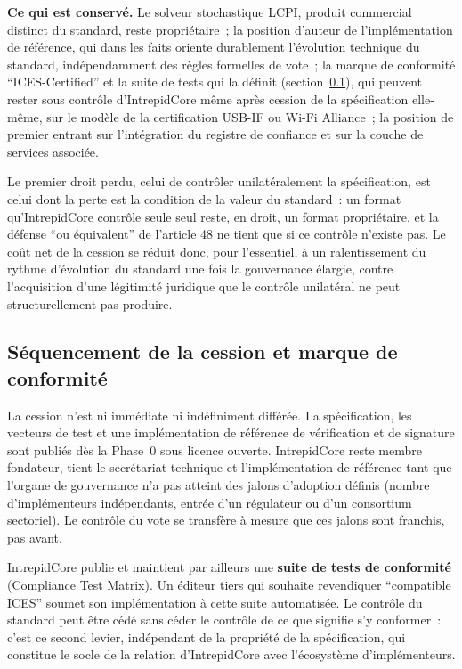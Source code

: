 \documentclass[11pt,a4paper]{article}
\begin{document}
\textbf{Ce qui est conservé.} Le solveur stochastique LCPI, produit commercial distinct du standard, reste propriétaire~; la position d'auteur de l'implémentation de référence, qui dans les faits oriente durablement l'évolution technique du standard, indépendamment des règles formelles de vote~; la marque de conformité \enquote{ICES-Certified} et la suite de tests qui la définit (section~\ref{sec:conformite}), qui peuvent rester sous contrôle d'IntrepidCore même après cession de la spécification elle-même, sur le modèle de la certification USB-IF ou Wi-Fi Alliance~; la position de premier entrant sur l'intégration du registre de confiance et sur la couche de services associée.

Le premier droit perdu, celui de contrôler unilatéralement la spécification, est celui dont la perte est la condition de la valeur du standard~: un format qu'IntrepidCore contrôle seule seul reste, en droit, un format propriétaire, et la défense \enquote{ou équivalent} de l'article 48 ne tient que si ce contrôle n'existe pas. Le coût net de la cession se réduit donc, pour l'essentiel, à un ralentissement du rythme d'évolution du standard une fois la gouvernance élargie, contre l'acquisition d'une légitimité juridique que le contrôle unilatéral ne peut structurellement pas produire.

\subsection{Séquencement de la cession et marque de conformité}\label{sec:conformite}

La cession n'est ni immédiate ni indéfiniment différée. La spécification, les vecteurs de test et une implémentation de référence de vérification et de signature sont publiés dès la Phase~0 sous licence ouverte. IntrepidCore reste membre fondateur, tient le secrétariat technique et l'implémentation de référence tant que l'organe de gouvernance n'a pas atteint des jalons d'adoption définis (nombre d'implémenteurs indépendants, entrée d'un régulateur ou d'un consortium sectoriel). Le contrôle du vote se transfère à mesure que ces jalons sont franchis, pas avant.

IntrepidCore publie et maintient par ailleurs une \textbf{suite de tests de conformité} (Compliance Test Matrix). Un éditeur tiers qui souhaite revendiquer \enquote{compatible ICES} soumet son implémentation à cette suite automatisée. Le contrôle du standard peut être cédé sans céder le contrôle de ce que signifie s'y conformer~: c'est ce second levier, indépendant de la propriété de la spécification, qui constitue le socle de la relation d'IntrepidCore avec l'écosystème d'implémenteurs.
\end{document}
